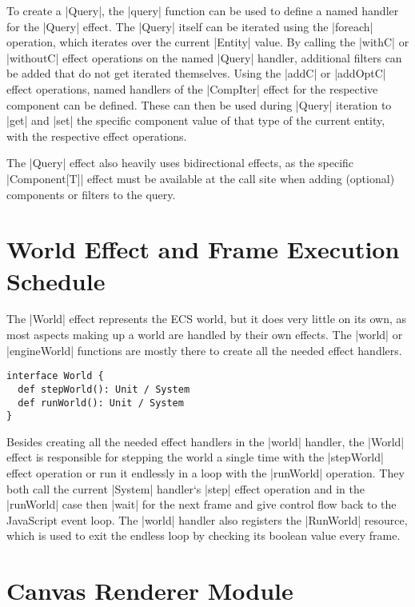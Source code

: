 To create a |Query|, the |query| function can be used to define a named handler for the |Query| effect. The |Query| itself can be iterated using the |foreach| operation, which iterates over the current |Entity| value. By calling the |withC| or |withoutC| effect operations on the named |Query| handler, additional filters can be added that do not get iterated themselves. Using the |addC| or |addOptC| effect operations, named handlers of the |CompIter| effect for the respective component can be defined. These can then be used during |Query| iteration to |get| and |set| the specific component value of that type of the current entity, with the respective effect operations.

The |Query| effect also heavily uses bidirectional effects, as the specific |Component[T]| effect must be available at the call site when adding (optional) components or filters to the query.

\section{World Effect and Frame Execution Schedule}

The |World| effect represents the ECS world, but it does very little on its own, as most aspects making up a world are handled by their own effects. The |world| or |engineWorld| functions are mostly there to create all the needed effect handlers.

\begin{lstlisting}[caption=World signature]
interface World {
  def stepWorld(): Unit / System
  def runWorld(): Unit / System
}
\end{lstlisting}

Besides creating all the needed effect handlers in the |world| handler, the |World| effect is responsible for stepping the world a single time with the |stepWorld| effect operation or run it endlessly in a loop with the |runWorld| operation. They both call the current |System| handler`s |step| effect operation and in the |runWorld| case then |wait| for the next frame and give control flow back to the JavaScript event loop. The |world| handler also registers the |RunWorld| resource, which is used to exit the endless loop by checking its boolean value every frame.

\section{Canvas Renderer Module}

